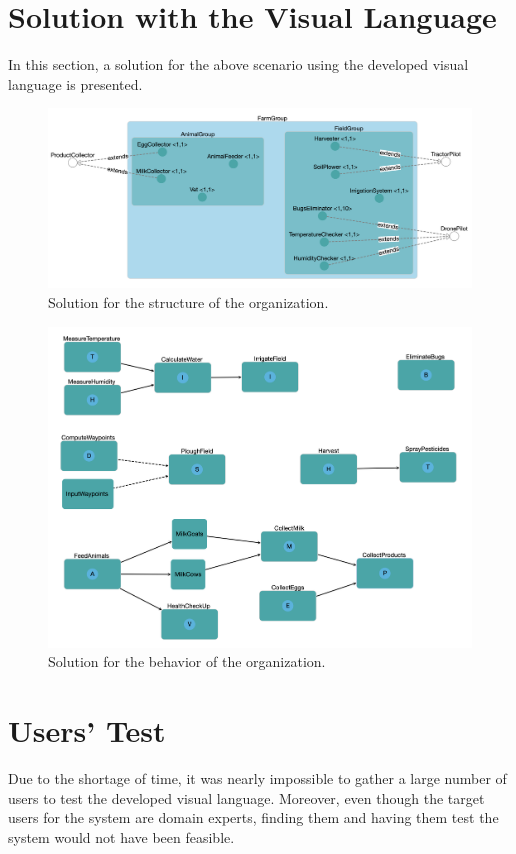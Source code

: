 \section{Solution with the Visual Language}
In this section, a solution for the above scenario using the developed visual language is presented.

\begin{figure}[H]
    \centering
    \includegraphics[width=\textwidth]{images/solution-structural.png}
    \caption{Solution for the structure of the organization.}
    \label{fig:solution-structural}
\end{figure}

\begin{figure}
    \centering
    \includegraphics[width=\textwidth]{images/solution-functional.png}
    \caption{Solution for the behavior of the organization.}
    \label{fig:solution-functional}
\end{figure}

\section{Users' Test}
Due to the shortage of time, it was nearly impossible to gather a large number of users to test the developed visual language.
Moreover, even though the target users for the system are domain experts, finding them and having them test the system would not have been feasible.

